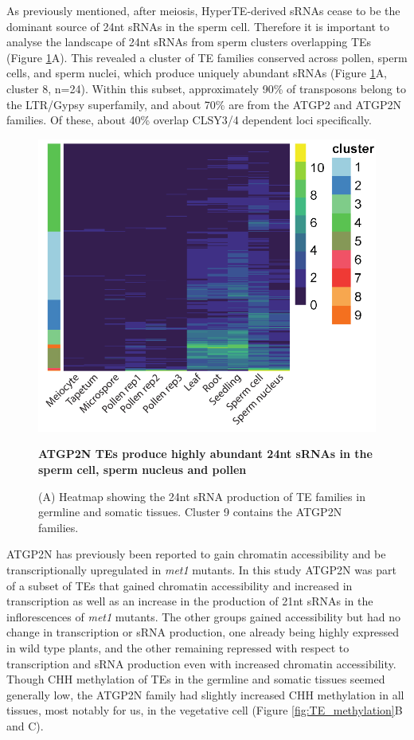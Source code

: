 As previously mentioned, after meiosis, HyperTE-derived sRNAs cease to be the dominant source of 24nt sRNAs in the sperm cell. Therefore it is important to analyse the landscape of 24nt sRNAs from sperm clusters overlapping TEs (Figure \ref{fig:TE_families}A). This revealed a cluster of TE families conserved across pollen, sperm cells, and sperm nuclei, which produce uniquely abundant sRNAs (Figure \ref{fig:TE_families}A, cluster 8, n=24). Within this subset, approximately 90\% of transposons belong to the LTR/Gypsy superfamily, and about 70\% are from the ATGP2 and ATGP2N families. Of these, about 40\% overlap CLSY3/4 dependent loci specifically.

\begin{figure}[htbp!] 
\centering    
    \includegraphics[width=1\textwidth]{Chapter2/Figs/Figure13_TE_families_heatmap.pdf}
\caption{\textbf{ATGP2N TEs produce highly abundant 24nt sRNAs in the sperm cell, sperm nucleus and pollen}}
\label{fig:TE_families}
\captionsetup{font=small}
    \caption*{(A) Heatmap showing the 24nt sRNA production of TE families in germline and somatic tissues. Cluster 9 contains the ATGP2N families.}
\end{figure}

ATGP2N has previously been reported to gain chromatin accessibility and be transcriptionally upregulated in \textit{met1} mutants. In this study ATGP2N was part of a subset of TEs that gained chromatin accessibility and increased in transcription as well as an increase in the production of 21nt sRNAs in the inflorescences of \textit{met1} mutants. The other groups gained accessibility but had no change in transcription or sRNA production, one already being highly expressed in wild type plants, and the other remaining repressed with respect to transcription and sRNA production even with increased chromatin accessibility\citep{RN184}. Though CHH methylation of TEs in the germline and somatic tissues seemed generally low, the ATGP2N family had slightly increased CHH methylation in all tissues, most notably for us, in the vegetative cell (Figure \ref{fig:TE_methylation}B and C).

